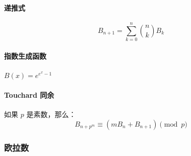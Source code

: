 \documentclass[a4paper, twoside]{article}
\begin{document}
            \paragraph{递推式}
            $$ B_{n + 1} = \sum_{k = 0} ^n {n\choose k} B_k $$
    
            \paragraph{指数生成函数} $B(x) = e^{e^x - 1}$
    
            \paragraph{Touchard 同余} 如果 $p$ 是素数，那么：
            $$ B_{n + p^m} \equiv (m B_n + B_{n + 1}) \pmod p $$


        \subsubsection{欧拉数}
        \label{EulerianNumber}
            \def \bangle{ \atopwithdelims \langle \rangle}
    
\end{document}
